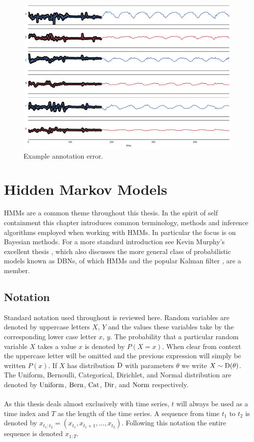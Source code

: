 \documentclass[12pt]{report}
\newcommand{\1}[0]{\mathbbm{1}}
\newcommand{\Unif}[0]{\textnormal{Uniform}}
\newcommand{\Cat}[0]{\textnormal{Cat}}
\newcommand{\Dir}[0]{\textnormal{Dir}}
\newcommand{\Bern}[0]{\textnormal{Bern}}
\newcommand{\Norm}[0]{\textnormal{Norm}}
\newcommand{\SomeDist}[0]{\textnormal{D}}
\newcommand{\seq}[3]{\ensuremath{#1_{{#2}:{#3}}}}
\begin{document}
\begin{figure}[t!]
    \centering
    \includegraphics[width=1\textwidth]{img/annot_error_activity_202928.pdf}
    \caption{Example annotation error.}
    \label{fig:annot-arror}
\end{figure}

\chapter{Hidden Markov Models}
\acp{HMM} \cite{rabiner-hmms} are a common theme throughout this thesis. 
In the spirit of self containment this chapter introduces common terminology, 
methods and inference algorithms employed when working with \acp{HMM}. In particular
the focus is on Bayesian methods. For a more standard introduction see Kevin Murphy's excellent thesis 
\cite{murphy-thesis}, which also discusses the more general class of probabilistic models 
known as \acp{DBN}, of which \acp{HMM} and the popular Kalman filter \cite{kalman-filter}, are a member.

\section{Notation}
Standard notation used throughout is reviewed here.
Random variables are denoted by uppercase letters $X$, $Y$ 
and the values these variables take by the corresponding lower case 
letter $x$, $y$. The probability that a particular random variable $X$
takes a value $x$ is denoted by $P(X=x)$. When clear from context the uppercase
letter will be omitted and the previous expression will simply be written
$P(x)$. If $X$ has distribution $\SomeDist$ with parameters $\theta$ we write
$X \sim \SomeDist(\theta)$. The Uniform, Bernoulli, Categorical, Dirichlet, and Normal distribution
are denoted by $\Unif$, $\Bern$, $\Cat$, $\Dir$, and $\Norm$ respectively.
\\\\
As this thesis deals almost exclusively with time series, $t$ will always
be used as a time index and $T$ as the length of the time series. 
A sequence from time $t_1$ to $t_2$ is denoted by 
$\seq{x}{t_1}{t_2} = (x_{t_1}, x_{t_1 + 1}, \ldots, x_{t_2})$.
Following this notation the entire sequence is denoted $\seq{x}{1}{T}$.
\end{document}
